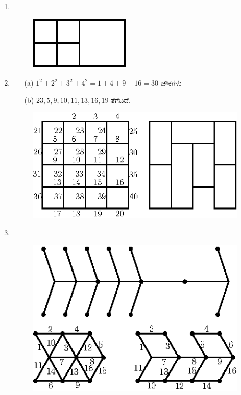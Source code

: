 \begin{enumerate}
\item 
~

\begin{figure}[H]
\centering
\includegraphics[scale=1.1]{images/chap4/ans16.eps}
 \end{figure}

\item 
\begin{itemize}
\item[(a)] $1^{2} + 2^{2} + 3^{2} + 4^{2} = 1 + 4 + 9 + 16 = 30$ ಚೌಕಗಳು 
\item[(b)] $23, 5, 9, 10, 11, 13, 16, 19$ ತೆಗೆದಿದೆ.
\end{itemize}

\begin{figure}[H]
\centering
\includegraphics{images/chap4/ans17.eps}
\end{figure}

\item 
~
\phantom{a}
\vskip -0.8cm
\begin{figure}[H]
\centering
\includegraphics{images/chap4/ans18.eps}
\end{figure}


\end{enumerate}
